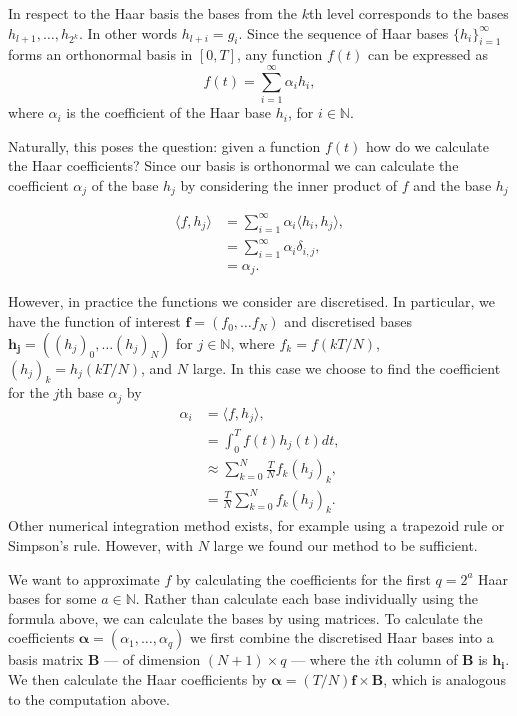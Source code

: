 \documentclass[../main.tex]{subfiles}
\begin{document}
In respect to the Haar basis the bases from the $k$th level corresponds to the bases $h_{l+1}, \dots, h_{2^k}$. In other words $h_{l+i} = g_{i}$. Since the sequence of Haar bases $\{h_i\}_{i=1}^{\infty}$ forms an orthonormal basis in $[0,T]$, any function $f(t)$ can be expressed as 
$$
f(t) = \sum^{\infty}_{i=1}  \alpha_{i} h_i,
$$
where $\alpha_i$ is the coefficient of the Haar base $h_i$, for $i \in \mathbb{N}.$

Naturally, this poses the question: given a function $f(t)$ how do we calculate the Haar coefficients? Since our basis is orthonormal we can calculate the coefficient $\alpha_j$ of the base $h_j$ by considering the inner product of $f$ and the base $h_j$ 

\begin{align*}
\langle f,h_j\rangle &= \sum^\infty_{i=1} \alpha_i \langle h_i,h_j\rangle, \\
&= \sum^\infty_{i=1} \alpha_i \delta_{i,j}, \\
&= \alpha_j.
 \end{align*}
 
 However, in practice the functions we consider are discretised. In particular, we have the function of interest $\mathbf{f} = (f_0,\dots f_N)$ and discretised bases $\mathbf{h_j} = ((h_j)_0, \dots (h_j)_N)$ for $j \in \mathbb{N}$, where $f_k = f(kT/N)$, $(h_j)_k = h_j(kT/N)$, and $N$ large. In this case we choose to find the coefficient for the $j$th base $\alpha_j$ by
 \begin{align*}
\alpha_i &= \langle f,h_j\rangle, \\
&= \int^T_0 f(t)h_j(t) dt, \\
&\approx \sum^N_{k=0} \frac{T}{N}f_k (h_j)_k, \\
&= \frac{T}{N}\sum^N_{k=0} f_k (h_j)_k.
 \end{align*}
Other numerical integration method exists, for example using a  trapezoid rule or Simpson's rule. However, with $N$ large we found our method to be sufficient. 


We want to approximate $f$ by calculating the coefficients for the first $q = 2^a$ Haar bases for some $a \in \mathbb{N}$. Rather than calculate each base individually using the formula above, we can calculate the bases by using matrices. To calculate the coefficients $\bm{\alpha} = (\alpha_1, \dots, \alpha_q)$ we first combine the discretised Haar bases into a basis matrix $\mathbf{B}$ --- of dimension $(N+1) \times q$ ---  where the $i$th column of $\mathbf{B}$ is $\mathbf{h_i}$. We then calculate the Haar coefficients by $\bm{\alpha} = (T/N) \mathbf{f}  \times \mathbf{B}$, which is analogous to the computation above. 
\end{document}
